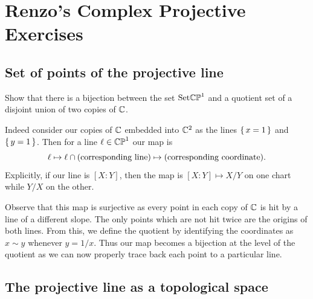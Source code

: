 \documentclass[12pt]{memoir}
\begin{document}
\chapter{Renzo's Complex Projective Exercises}

\section{Set of points of the projective line}

\begin{Ej}
    Show that there is a bijection between the set $\text{Set}\mathbb{CP}^1$
 and a quotient set of a disjoint union of two copies of $\mathbb{C}$.
\end{Ej}

\begin{ptcbr}
    Indeed consider our copies of $\mathbb{C}$ embedded into $\mathbb{C}^2$ as the lines $\{\,x=1\,\}$ and $\{\,y=1\,\}$. Then for a line $\ell\in\mathbb{CP}^1$ our map is 
    $$\ell\mapsto \ell\cap(\text{corresponding line})\mapsto (\text{corresponding coordinate}).$$
    Explicitly, if our line is $[X:Y]$, then the map is $[X:Y]\mapsto X/Y$ on one chart while $Y/X$ on the other.\par 
    Observe that this map is surjective as every point in each copy of $\mathbb{C}$ is hit by a line of a different slope. The only points which are not hit twice are the origins of both lines. From this, we define the quotient by identifying the coordinates as $x\sim y$ whenever $y=1/x$. Thus our map becomes a bijection at the level of the quotient as we can now properly trace back each point to a particular line. 
\end{ptcbr}
\section{The projective line as a topological space}
\end{document}
